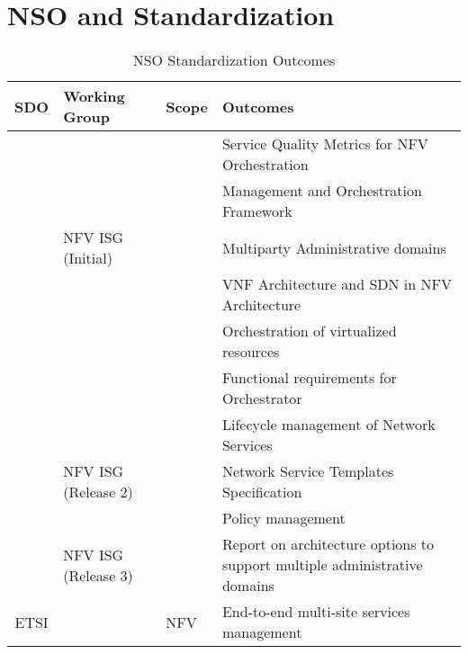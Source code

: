 \section{NSO and Standardization} %
\label{sec:stand}





\begin{table*}[t]
\scriptsize
\caption{NSO Standardization Outcomes}
\label{Tab:NSO}
\centering
\renewcommand{\arraystretch}{1.3}
\setlength{\arrayrulewidth}{1pt}
\begin{tabular}{c p{3cm} p{3.2cm} m{8.2cm}}
\\
\hline

\textbf{SDO} & \textbf{Working Group} & \textbf{Scope} & \textbf{Outcomes} \\ \hline\hline

 & &  & Service Quality Metrics for NFV Orchestration \cite{ETSIISGNFVGSMetrics} \\
& & & \cellcolor{gray!25} Management and Orchestration Framework~\cite{ETSIIndustrySpecificationGroupISGNFV2013NetworkFramework} \\
& \multirow{-3}{*}{NFV ISG (Initial)} & & Multiparty Administrative domains \cite{ETSIISGNFV2016GRGuidance} \\ \hhline{~-~-}
& & & \cellcolor{gray!25} VNF Architecture and SDN in NFV Architecture~\cite{ETSIISGNFV2014GSArchitecture} \\
& & & Orchestration of virtualized resources~\cite{ETSIISGNFV2017GSSpecification} \\
& & & \cellcolor{gray!25} Functional requirements for Orchestrator~\cite{ETSIISGNFV2017GSSpecification} \\
& & & Lifecycle management of Network Services~\cite{ETSIISGNFV2017GSSpecification} \\
& \multirow{-5}{*}{NFV ISG (Release 2)} & & \cellcolor{gray!25} Network Service Templates Specification \cite{ETSIISGNFV2017GSSpecificationd} \\
\hhline{~-~-}
& & & Policy management~\cite{ETSIISGNFV2017GR3}\\
& NFV ISG (Release 3) & & \cellcolor{gray!25} Report on architecture options to support multiple administrative domains \cite{ETSIGRDomains} \\
\multirow{-10}{*}{ETSI} &  & \multirow{-9}{*}{NFV} &  End-to-end multi-site services management~\cite{ETSIISGNFV2018} \\ \hline


\end{tabular}
\end{table*}
